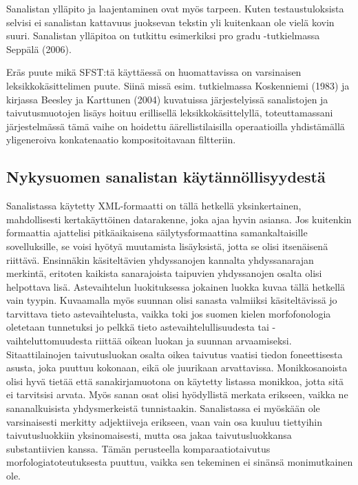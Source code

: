 \documentclass[free]{flammie}
\begin{document}
Sanalistan ylläpito ja laajentaminen ovat myös tarpeen. Kuten testaustuloksista
selvisi ei sanalistan kattavuus juoksevan tekstin yli kuitenkaan ole vielä kovin
suuri. Sanalistan ylläpitoa on tutkittu esimerkiksi pro gradu -tutkielmassa Seppälä
(2006).

Eräs puute mikä SFST:tä käyttäessä on huomattavissa on varsinaisen leksikkokäsittelimen puute. Siinä missä esim. tutkielmassa Koskenniemi (1983) ja kirjassa
Beesley ja Karttunen (2004) kuvatuissa järjestelyissä sanalistojen ja taivutusmuotojen lisäys hoituu erillisellä leksikkokäsittelyllä, toteuttamassani järjestelmässä
tämä vaihe on hoidettu äärellistilaisilla operaatioilla yhdistämällä yligeneroiva
konkatenaatio kompositoitavaan filtteriin.

\subsection{Nykysuomen sanalistan käytännöllisyydestä}

Sanalistassa käytetty XML-formaatti on tällä hetkellä yksinkertainen, mahdollisesti kertakäyttöinen datarakenne, joka ajaa hyvin asiansa. Jos kuitenkin formaattia ajattelisi pitkäaikaisena säilytysformaattina samankaltaisille sovelluksille, se
voisi hyötyä muutamista lisäyksistä, jotta se olisi itsenäisenä riittävä. Ensinnäkin käsiteltävien yhdyssanojen kannalta yhdyssanarajan merkintä, eritoten kaikista sanarajoista taipuvien yhdyssanojen osalta olisi helpottava lisä. Astevaihtelun luokituksessa jokainen luokka kuvaa tällä hetkellä vain tyypin. Kuvaamalla
myös suunnan olisi sanasta valmiiksi käsiteltävissä jo tarvittava tieto astevaihtelusta, vaikka toki jos suomen kielen morfofonologia oletetaan tunnetuksi jo pelkkä tieto astevaihtelullisuudesta tai -vaihteluttomuudesta riittää oikean luokan ja
suunnan arvaamiseksi. Sitaattilainojen taivutusluokan osalta oikea taivutus vaatisi tiedon foneettisesta asusta, joka puuttuu kokonaan, eikä ole juurikaan arvattavissa. Monikkosanoista olisi hyvä tietää että sanakirjamuotona on käytetty listassa monikkoa, jotta sitä ei tarvitsisi arvata. Myös sanan osat olisi hyödyllistä
merkata erikseen, vaikka ne sananalkuisista yhdysmerkeistä tunnistaakin. Sanalistassa ei myöskään ole varsinaisesti merkitty adjektiiveja erikseen, vaan vain osa
kuuluu tiettyihin taivutusluokkiin yksinomaisesti, mutta osa jakaa taivutusluokkansa substantiivien kanssa. Tämän perusteella komparaatiotaivutus morfologiatoteutuksesta puuttuu, vaikka sen tekeminen ei sinänsä monimutkainen ole.
\end{document}
